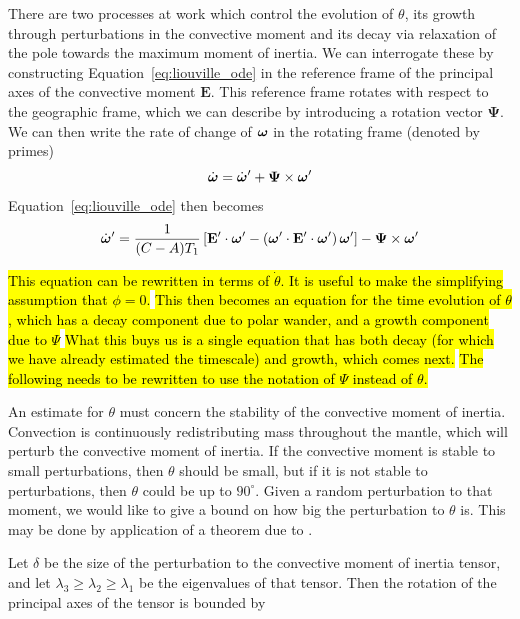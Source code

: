 \documentclass[extra,mreferee]{gji}
\begin{document}
There are two processes at work which control the evolution of $\theta$, its growth through perturbations in the convective moment and 
its decay via relaxation of the pole towards the maximum moment of inertia.
We can interrogate these by constructing Equation~\eqref{eq:liouville_ode} in the reference frame
of the principal axes of the convective moment $\mathbf{E}$.
This reference frame rotates with respect to the geographic frame, which we can
describe by introducing a rotation vector $\mathbf{\Psi}$.
We can then write the rate of change of $\mitbf{\omega}$ in the rotating frame (denoted by primes)
\begin{equation}
\dot{\mitbf{\omega}} = \dot{\mitbf{\omega}}^\prime + \mathbf{\Psi}\times \mitbf{\omega}^\prime
\end{equation}
Equation~\eqref{eq:liouville_ode} then becomes
\begin{equation}
 \dot{\mitbf{\omega}}^\prime  = \frac{1}{(C-A)T_1} \left[ \mathbf{E}^\prime \cdot \mitbf{\omega}^\prime - \left( \mitbf{\omega}^\prime \cdot \mathbf{E}^\prime \cdot \mitbf{\omega}^\prime  \right) \mitbf{\omega}^\prime \right] - \mathbf{\Psi}\times \mitbf{\omega}^\prime
\label{eq:liouville_ode_new_frame}
\end{equation}

\hl{This equation can be rewritten in terms of $\dot{\theta}$. It is useful to make the simplifying assumption that $\phi=0$.}
\hl{This then becomes an equation for the time evolution of $\theta$, which has a decay component due to polar wander, and a growth component due to $\Psi$}
\hl{What this buys us is a single equation that has both decay (for which we have already estimated the timescale) and growth, which comes next.}
\hl{The following needs to be rewritten to use the notation of $\Psi$ instead of $\theta$.}


An estimate for $\theta$ must concern the stability of the convective moment of inertia. 
Convection is continuously redistributing mass throughout the mantle, which will perturb the convective moment of inertia.  
If the convective moment is stable to small perturbations, then $\theta$ should be small, but if it is not stable to perturbations, then $\theta$ could be up to $90^\circ$. 
Given a random perturbation to that moment, we would like to give a bound on how big the perturbation to $\theta$ is. 
This may be done by application of a theorem due to \citet{davis1970rotation}.

Let $\delta$ be the size of the perturbation to the convective moment of inertia tensor, and let $\lambda_3 \ge \lambda_2 \ge \lambda_1$ be the eigenvalues of that tensor.  
Then the rotation of the principal axes of the tensor is bounded by
\end{document}
